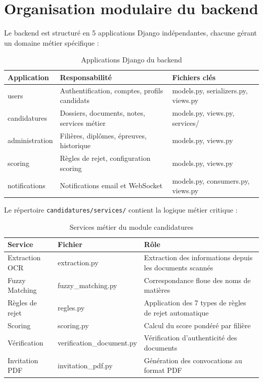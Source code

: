 \section{Organisation modulaire du backend}
\label{organisation-modulaire-du-backend}

Le backend est structuré en 5 applications Django indépendantes, chacune gérant un domaine métier spécifique :

\begin{table}[htbp]
  \centering
  \caption{Applications Django du backend}
  \begin{tabularx}{\textwidth}{@{} l X l @{}}
    \toprule
    \textbf{Application} & \textbf{Responsabilité} & \textbf{Fichiers clés} \\
    \midrule
    users & Authentification, comptes, profils candidats & models.py, serializers.py, views.py \\
    candidatures & Dossiers, documents, notes, services métier & models.py, views.py, services/ \\
    administration & Filières, diplômes, épreuves, historique & models.py, views.py \\
    scoring & Règles de rejet, configuration scoring & models.py, views.py \\
    notifications & Notifications email et WebSocket & models.py, consumers.py, views.py \\
    \bottomrule
  \end{tabularx}
  \label{tab:apps-django}
\end{table}

Le répertoire \texttt{candidatures/services/} contient la logique métier critique :

\begin{table}[htbp]
  \centering
  \caption{Services métier du module candidatures}
  \begin{tabularx}{\textwidth}{@{} l l X @{}}
    \toprule
    \textbf{Service} & \textbf{Fichier} & \textbf{Rôle} \\
    \midrule
    Extraction OCR & extraction.py & Extraction des informations depuis les documents scannés \\
    Fuzzy Matching & fuzzy\_matching.py & Correspondance floue des noms de matières \\
    Règles de rejet & regles.py & Application des 7 types de règles de rejet automatique \\
    Scoring & scoring.py & Calcul du score pondéré par filière \\
    Vérification & verification\_document.py & Vérification d'authenticité des documents \\
    Invitation PDF & invitation\_pdf.py & Génération des convocations au format PDF \\
    \bottomrule
  \end{tabularx}
  \label{tab:services}
\end{table}

